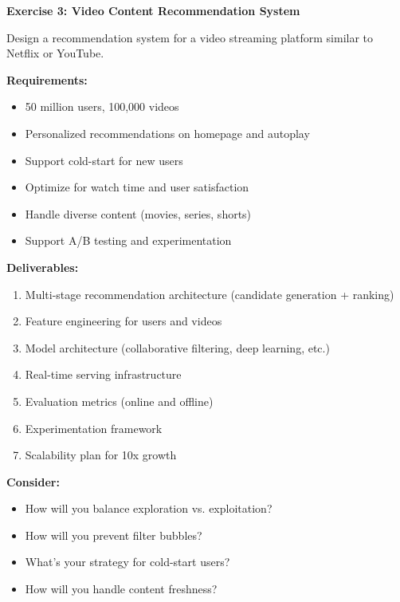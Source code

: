 \begin{exercise}
\textbf{Exercise 3: Video Content Recommendation System}

Design a recommendation system for a video streaming platform similar to Netflix or YouTube.

\textbf{Requirements:}
\begin{itemize}
    \item 50 million users, 100,000 videos
    \item Personalized recommendations on homepage and autoplay
    \item Support cold-start for new users
    \item Optimize for watch time and user satisfaction
    \item Handle diverse content (movies, series, shorts)
    \item Support A/B testing and experimentation
\end{itemize}

\textbf{Deliverables:}
\begin{enumerate}
    \item Multi-stage recommendation architecture (candidate generation + ranking)
    \item Feature engineering for users and videos
    \item Model architecture (collaborative filtering, deep learning, etc.)
    \item Real-time serving infrastructure
    \item Evaluation metrics (online and offline)
    \item Experimentation framework
    \item Scalability plan for 10x growth
\end{enumerate}

\textbf{Consider:}
\begin{itemize}
    \item How will you balance exploration vs. exploitation?
    \item How will you prevent filter bubbles?
    \item What's your strategy for cold-start users?
    \item How will you handle content freshness?
\end{itemize}
\end{exercise}

